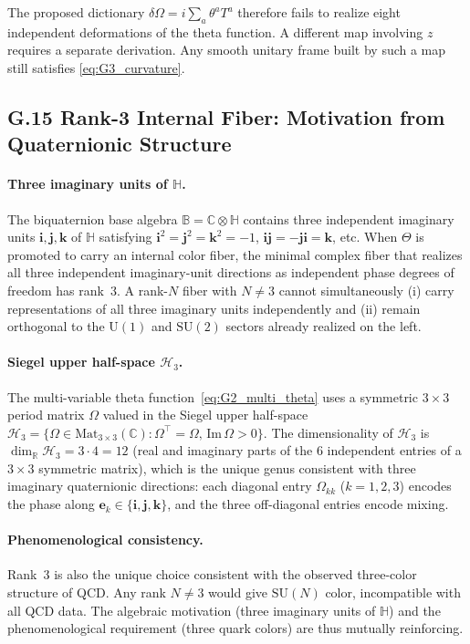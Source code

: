 The proposed dictionary $\delta\Omega=i\sum_a\theta^aT^a$ therefore fails
to realize eight independent deformations of the theta function. A
different map involving $z$ requires a separate derivation. Any smooth
unitary frame built by such a map still satisfies \eqref{eq:G3_curvature}.

\subsection*{G.15 Rank-3 Internal Fiber: Motivation from Quaternionic Structure}
\label{sec:G15_rank3}

\paragraph{Three imaginary units of $\mathbb{H}$.}
The biquaternion base algebra $\mathbb{B}=\mathbb{C}\otimes\mathbb{H}$ contains three
independent imaginary units $\mathbf{i},\mathbf{j},\mathbf{k}$ of $\mathbb{H}$ satisfying
$\mathbf{i}^2=\mathbf{j}^2=\mathbf{k}^2=-1$,
$\mathbf{i}\mathbf{j}=-\mathbf{j}\mathbf{i}=\mathbf{k}$, etc.
When $\Theta$ is promoted to carry an internal color fiber, the minimal complex fiber
that realizes all three independent imaginary-unit directions as independent phase degrees
of freedom has rank~3.  A rank-$N$ fiber with $N\neq 3$ cannot simultaneously
(i) carry representations of all three imaginary units independently and
(ii) remain orthogonal to the $\mathrm{U}(1)$ and $\mathrm{SU}(2)$ sectors already
realized on the left.

\paragraph{Siegel upper half-space $\mathcal{H}_3$.}
The multi-variable theta function~\eqref{eq:G2_multi_theta} uses a symmetric $3\times3$
period matrix $\Omega$ valued in the Siegel upper half-space
$\mathcal{H}_3 = \{\Omega\in\mathrm{Mat}_{3\times3}(\mathbb{C}):\Omega^\top=\Omega,\,
\mathrm{Im}\,\Omega>0\}$.
The dimensionality of $\mathcal{H}_3$ is $\dim_\mathbb{R}\mathcal{H}_3 = 3\cdot 4 = 12$
(real and imaginary parts of the 6 independent entries of a $3\times3$ symmetric matrix),
which is the unique genus consistent with three imaginary quaternionic directions:
each diagonal entry $\Omega_{kk}$ ($k=1,2,3$) encodes the phase along $\mathbf{e}_k\in\{\mathbf{i},\mathbf{j},\mathbf{k}\}$,
and the three off-diagonal entries encode mixing.

\paragraph{Phenomenological consistency.}
Rank~3 is also the unique choice consistent with the observed three-color structure of QCD.
Any rank $N\neq 3$ would give $\mathrm{SU}(N)$ color, incompatible with all QCD data.
The algebraic motivation (three imaginary units of $\mathbb{H}$) and the phenomenological
requirement (three quark colors) are thus mutually reinforcing.


